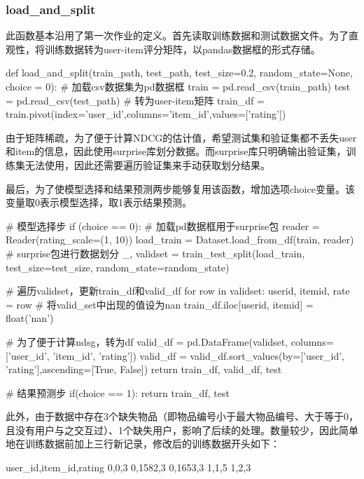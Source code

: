 \documentclass[12pt, a4paper]{ctexart}
\begin{document}
\subsubsection{load\_and\_split}

此函数基本沿用了第一次作业的定义。首先读取训练数据和测试数据文件。为了直观性，将训练数据转为user-item评分矩阵，以pandas数据框的形式存储。
\begin{python}
def load_and_split(train_path, test_path, test_size=0.2, random_state=None, choice = 0):
  # 加载csv数据集为pd数据框
  train = pd.read_csv(train_path)
  test = pd.read_csv(test_path)
  # 转为user-item矩阵
  train_df = train.pivot(index='user_id',columns='item_id',values=['rating']) 
\end{python}


由于矩阵稀疏，为了便于计算NDCG的估计值，希望测试集和验证集都不丢失user和item的信息，因此使用surprise库划分数据。而surprise库只明确输出验证集，训练集无法使用，因此还需要遍历验证集来手动获取划分结果。

最后，为了使模型选择和结果预测两步能够复用该函数，增加选项choice变量。该变量取0表示模型选择，取1表示结果预测。

\begin{python}
  # 模型选择步
  if (choice == 0):
    # 加载pd数据框用于surprise包
    reader = Reader(rating_scale=(1, 10))
    load_train = Dataset.load_from_df(train, reader)
    # surprise包进行数据划分
    _, validset = train_test_split(load_train, test_size=test_size, random_state=random_state)

    # 遍历validset，更新train_df和valid_df
    for row in validset:
        userid, itemid, rate = row
        # 将valid_set中出现的值设为nan
        train_df.iloc[userid, itemid] = float('nan')
    
    # 为了便于计算ndsg，转为df
    valid_df = pd.DataFrame(validset, columns=['user_id', 'item_id', 'rating'])
    valid_df = valid_df.sort_values(by=['user_id', 'rating'],ascending=[True, False])
    return train_df, valid_df, test
  
  # 结果预测步
  if(choice == 1):
     return train_df, test
\end{python}

此外，由于数据中存在3个缺失物品（即物品编号小于最大物品编号、大于等于0，且没有用户与之交互过）、1个缺失用户，影响了后续的处理。数量较少，因此简单地在训练数据前加上三行新记录，修改后的训练数据开头如下：
\begin{python}
user_id,item_id,rating
0,0,3
0,1582,3
0,1653,3
1,1,5
1,2,3
\end{python}
\end{document}
